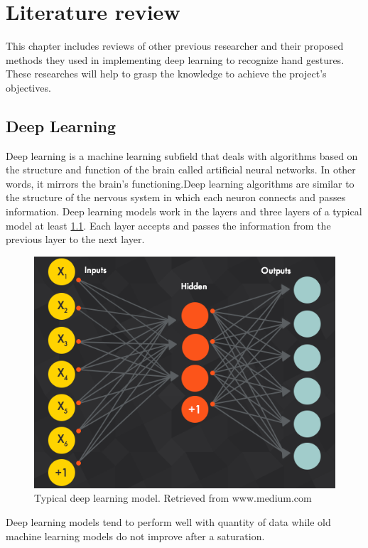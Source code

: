 \documentclass[12pt]{report}
\begin{document}
\chapter{Literature review}

This chapter includes reviews of other previous researcher
and their proposed methods they used in implementing deep learning
to recognize hand gestures. These researches will help to grasp the knowledge
to achieve the project's objectives. 

\section{Deep Learning}
Deep learning is a machine learning subfield that deals with algorithms based 
on the structure and function of the brain called artificial neural networks. 
In other words, it mirrors the brain's functioning.Deep learning algorithms are similar to the structure of 
the nervous system in which each neuron connects and passes information.
Deep learning models work in the layers and three layers of a typical model at least \ref{fig:deep_learining}. 
Each layer accepts and passes the information from the previous layer to the next layer.

\begin{figure} [h]
    \centering
    \includegraphics[width=\textwidth]{./images/deep_learning.png}
    \caption{Typical deep learning model. Retrieved from www.medium.com}
    \label{fig:deep_learining}
\end{figure}

Deep learning models tend to perform well with quantity of data while old machine 
learning models do not improve after a saturation.
\end{document}
